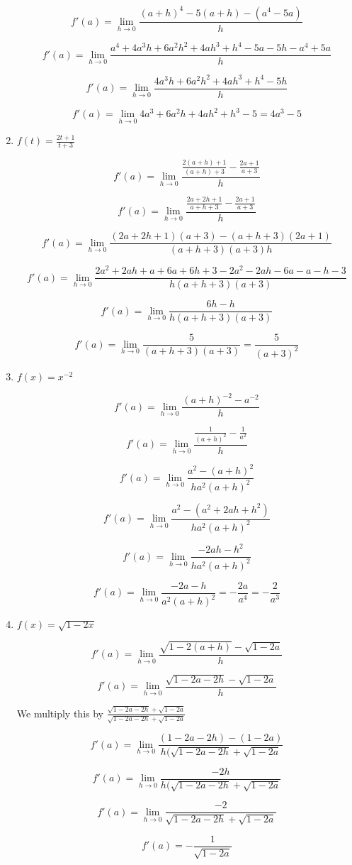 \documentclass{article}
\begin{document}
\begin{enumerate}
			$$f'(a) = \lim \limits _{h \to 0} \frac{(a+h)^4 - 5(a+h) - (a^4 - 5a)}{h}$$

			$$f'(a) = \lim \limits _{h \to 0} \frac{a^4+4a^3h+6a^2h^2+4ah^3+h^4-5a-5h-a^4+5a}{h}$$

			$$f'(a) = \lim \limits _{h \to 0} \frac{4a^3h + 6a^2h^2 + 4ah^3 + h^4 - 5h}{h}$$

			$$f'(a) = \lim \limits _{h \to 0} 4a^3 + 6a^2h + 4ah^2 + h^3 - 5 = 4a^3 - 5$$

		\item $f(t) = \frac{2t+1}{t+3}$

			$$f'(a) = \lim \limits _{h \to 0} \frac{ \frac{2(a+h)+1}{(a+h)+3} - \frac{2a+1}{a+3}}{h}$$

			$$f'(a) = \lim \limits _{h \to 0} \frac{ \frac{2a + 2h + 1}{a + h + 3} - \frac{2a+1}{a+3} }{h}$$

			$$f'(a) = \lim \limits _{h \to 0} \frac{(2a+2h+1)(a+3) - (a+h+3)(2a+1)}{(a+h+3)(a+3)h}$$

			$$f'(a) = \lim \limits _{h \to 0} \frac{2a^2+2ah+a+6a+6h+3-2a^2-2ah-6a-a-h-3}{h(a+h+3)(a+3)}$$

			$$f'(a) = \lim \limits _{h \to 0} \frac{6h-h}{h(a+h+3)(a+3)}$$

			$$f'(a) = \lim \limits _{h \to 0} \frac{5}{(a+h+3)(a+3)} = \frac{5}{(a+3)^2}$$

		\item $f(x) = x^{-2}$

			$$f'(a) = \lim \limits _{h \to 0} \frac{(a+h)^{-2} - a^{-2}}{h}$$

			$$f'(a) = \lim \limits _{h \to 0} \frac{ \frac{1}{(a+h)^2} - \frac{1}{a^2} }{h}$$

			$$f'(a) = \lim \limits _{h \to 0} \frac{ a^2 - (a+h)^2 }{ha^2(a+h)^2}$$

			$$f'(a) = \lim \limits _{h \to 0} \frac{a^2 - (a^2+2ah+h^2)}{ha^2(a+h)^2}$$

			$$f'(a) = \lim \limits _{h \to 0} \frac{-2ah-h^2}{ha^2(a+h)^2}$$

			$$f'(a) = \lim \limits _{h \to 0} \frac{-2a-h}{a^2(a+h)^2} = - \frac{2a}{a^4} = - \frac{2}{a^3}$$			

		\item $f(x) = \sqrt{1-2x}$

			$$f'(a) = \lim \limits _{h \to 0} \frac{\sqrt{1-2(a+h)} - \sqrt{1-2a}}{h}$$

			$$f'(a) = \lim \limits _{h \to 0} \frac{\sqrt{1-2a-2h} - \sqrt{1-2a}}{h}$$

			We multiply this by $\frac{ \sqrt{1-2a-2h} + \sqrt{1-2a} }{ \sqrt{1-2a-2h} + \sqrt{1-2a}}$

			$$f'(a) = \lim \limits _{h \to 0} \frac{(1-2a-2h) - (1-2a)}{h(\sqrt{1-2a-2h} + \sqrt{1-2a}}$$

			$$f'(a) = \lim \limits _{h \to 0} \frac{-2h}{h(\sqrt{1-2a-2h} + \sqrt{1-2a}}$$

			$$f'(a) = \lim \limits _{h \to 0} \frac{-2}{\sqrt{1-2a-2h} + \sqrt{1-2a}}$$

			$$f'(a) = - \frac{1}{\sqrt{1-2a}}$$
	\end{enumerate}
\end{document}
